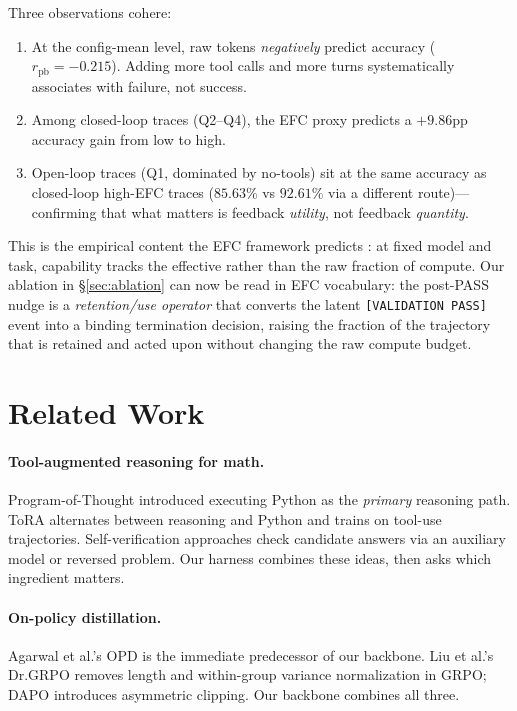 \documentclass[10pt]{article}
\begin{document}
Three observations cohere:
\begin{enumerate}
  \item At the config-mean level, raw tokens \emph{negatively} predict accuracy ($r_\text{pb}{=}{-}0.215$). Adding more tool calls and more turns systematically associates with failure, not success.
  \item Among closed-loop traces (Q2--Q4), the EFC proxy predicts a $+9.86$pp accuracy gain from low to high.
  \item Open-loop traces (Q1, dominated by no-tools) sit at the same accuracy as closed-loop high-EFC traces ($85.63\%$ vs $92.61\%$ via a different route)---confirming that what matters is feedback \emph{utility}, not feedback \emph{quantity}.
\end{enumerate}

This is the empirical content the EFC framework predicts \citep{efc2026}: at fixed model and task, capability tracks the effective rather than the raw fraction of compute. Our ablation in \S\ref{sec:ablation} can now be read in EFC vocabulary: the post-PASS nudge is a \emph{retention/use operator} that converts the latent \texttt{[VALIDATION PASS]} event into a binding termination decision, raising the fraction of the trajectory that is retained and acted upon without changing the raw compute budget.

\section{Related Work}

\paragraph{Tool-augmented reasoning for math.} Program-of-Thought \citep{pot} introduced executing Python as the \emph{primary} reasoning path. ToRA \citep{tora} alternates between reasoning and Python and trains on tool-use trajectories. Self-verification approaches \citep{selfverify} check candidate answers via an auxiliary model or reversed problem. Our harness combines these ideas, then asks which ingredient matters.

\paragraph{On-policy distillation.} Agarwal et al.'s OPD \citep{opd} is the immediate predecessor of our backbone. Liu et al.'s Dr.GRPO \citep{drgrpo} removes length and within-group variance normalization in GRPO; DAPO \citep{dapo} introduces asymmetric clipping. Our backbone combines all three.
\end{document}
